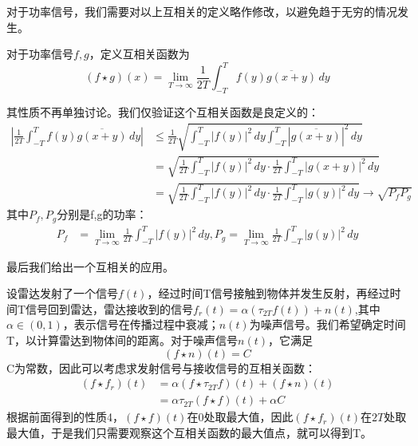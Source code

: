 对于功率信号，我们需要对以上互相关的定义略作修改，以避免趋于无穷的情况发生。
\begin{definition}[功率信号的互相关]
    对于功率信号$f,g$，定义互相关函数为
\begin{equation}
    (f\star g)(x)=\lim_{T\to\infty}\frac{1}{2T}\int_{-T}^{T}f(y)\overline{g(x+y)}\,dy
\end{equation}
\end{definition}
其性质不再单独讨论。我们仅验证这个互相关函数是良定义的：
\begin{align*}
    \left|\frac{1}{2T}\int_{-T}^{T}f(y)\overline{g(x+y)}\,dy\right|& \leq \frac{1}{2T}\sqrt{\int_{-T}^{T}|f(y)|^2\,dy\int_{-T}^{T}\left|\overline{g(x+y)}\right|^2\,dy}\\
    & =\sqrt{\frac{1}{2T}\int_{-T}^{T}|f(y)|^2\,dy\cdot\frac{1}{2T}\int_{-T}^{T}|g(x+y)|^2\,dy}\\
    & =\sqrt{\frac{1}{2T}\int_{-T}^{T}|f(y)|^2\,dy\cdot\frac{1}{2T}\int_{-T}^{T}|g(y)|^2\,dy}\to \sqrt{P_f P_g}
\end{align*}
其中$P_f,P_g$分别是f,g的功率：\begin{align*}
P_f&=\lim_{T\to\infty}\frac{1}{2T}\int_{-T}^{T}|f(y)|^2\,dy,P_g=\lim_{T\to\infty}\frac{1}{2T}\int_{-T}^{T}|g(y)|^2\,dy
\end{align*}

最后我们给出一个互相关的应用\cite{brad_osgood_ee261}。
\begin{example}[雷达测距]
    设雷达发射了一个信号$f(t)$，经过时间T信号接触到物体并发生反射，再经过时间T信号回到雷达，雷达接收到的信号$f_r(t)=\alpha (\tau_{2T}f(t))+n(t)$,其中$\alpha\in(0,1)$，表示信号在传播过程中衰减；$n(t)$为噪声信号。我们希望确定时间T，以计算雷达到物体间的距离。对于噪声信号$n(t)$，它满足
    \[(f\star n)(t)=C\]
    C为常数，因此可以考虑求发射信号与接收信号的互相关函数：
    \begin{align*}
        (f\star f_r)(t)&=\alpha(f\star \tau_{2T}f)(t)+(f\star n)(t)\\
        &=\alpha\tau_{2T}(f\star f)(t)+\alpha C
    \end{align*}
    根据前面得到的性质4，$(f\star f)(t)$在0处取最大值，因此$(f\star f_r)(t)$在$2T$处取最大值，于是我们只需要观察这个互相关函数的最大值点，就可以得到T。
\end{example}
